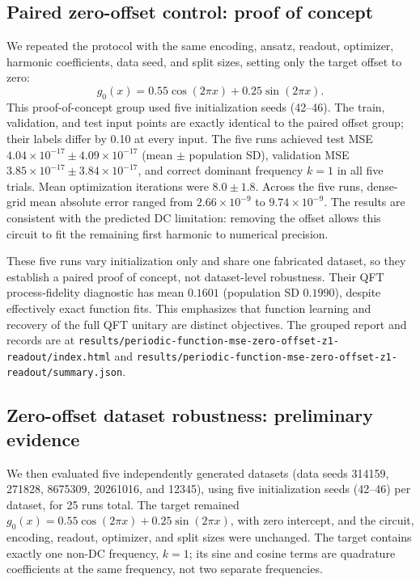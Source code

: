 \documentclass[11pt]{article}
\begin{document}
\subsection{Paired zero-offset control: proof of concept}

We repeated the protocol with the same encoding, ansatz, readout, optimizer, harmonic coefficients, data seed, and split sizes, setting only the target offset to zero:
\begin{equation}
  g_0(x)=0.55\cos(2\pi x)+0.25\sin(2\pi x).
\end{equation}
This proof-of-concept group used five initialization seeds (42--46). The train, validation, and test input points are exactly identical to the paired offset group; their labels differ by 0.10 at every input. The five runs achieved test MSE $4.04\times10^{-17}\pm4.09\times10^{-17}$ (mean $\pm$ population SD), validation MSE $3.85\times10^{-17}\pm3.84\times10^{-17}$, and correct dominant frequency $k=1$ in all five trials. Mean optimization iterations were $8.0\pm1.8$. Across the five runs, dense-grid mean absolute error ranged from $2.66\times10^{-9}$ to $9.74\times10^{-9}$. The results are consistent with the predicted DC limitation: removing the offset allows this circuit to fit the remaining first harmonic to numerical precision.

These five runs vary initialization only and share one fabricated dataset, so they establish a paired proof of concept, not dataset-level robustness. Their QFT process-fidelity diagnostic has mean $0.1601$ (population SD $0.1990$), despite effectively exact function fits. This emphasizes that function learning and recovery of the full QFT unitary are distinct objectives. The grouped report and records are at \texttt{results/periodic-function-mse-zero-offset-z1-readout/index.html} and \texttt{results/periodic-function-mse-zero-offset-z1-readout/summary.json}.

\subsection{Zero-offset dataset robustness: preliminary evidence}

We then evaluated five independently generated datasets (data seeds 314159, 271828, 8675309, 20261016, and 12345), using five initialization seeds (42--46) per dataset, for 25 runs total. The target remained $g_0(x)=0.55\cos(2\pi x)+0.25\sin(2\pi x)$, with zero intercept, and the circuit, encoding, readout, optimizer, and split sizes were unchanged. The target contains exactly one non-DC frequency, $k=1$; its sine and cosine terms are quadrature coefficients at the same frequency, not two separate frequencies.
\end{document}
